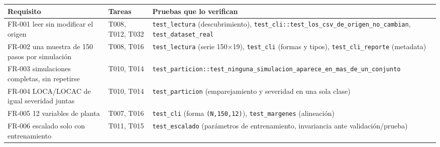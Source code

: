 \documentclass[12pt,a4paper]{article}
\newcounter{none} %
\newenvironment{documentogenerado}[2]{%
  \def\doccomando{#1}\def\docruta{#2}%
  \par\begingroup\small\setstretch{1.15}\sloppy%
}{\endgroup\par\medskip}
\begin{document}
\begin{documentogenerado}{/speckit-analyze + /speckit-converge}{specs\slash 001-preparacion-datos\slash auditoria.md}
{\def\LTcaptype{none} %
\begin{longtable}[]{@{}
  >{\raggedright\arraybackslash\hspace{0pt}}p{}
  >{\raggedright\arraybackslash\hspace{0pt}}p{}
  >{\raggedright\arraybackslash\hspace{0pt}}p{}@{}}
\toprule\noalign{}
\begin{minipage}[b]{\linewidth}\raggedright
Requisito
\end{minipage} & \begin{minipage}[b]{\linewidth}\raggedright
Tareas
\end{minipage} & \begin{minipage}[b]{\linewidth}\raggedright
Pruebas que lo verifican
\end{minipage} \\
\midrule\noalign{}
\endhead
\bottomrule\noalign{}
\endlastfoot
FR-001 leer sin modificar el origen & T008, T012, T032 & \texttt{test\_\allowbreak{}lectura} (descubrimiento), \texttt{test\_\allowbreak{}cli::test\_\allowbreak{}los\_\allowbreak{}csv\_\allowbreak{}de\_\allowbreak{}origen\_\allowbreak{}no\_\allowbreak{}cambian}, \texttt{test\_\allowbreak{}dataset\_\allowbreak{}real} \\
FR-002 una muestra de 150 pasos por simulación & T008, T016 & \texttt{test\_\allowbreak{}lectura} (serie 150×19), \texttt{test\_\allowbreak{}cli} (formas y tipos), \texttt{test\_\allowbreak{}cli\_\allowbreak{}reporte} (metadata) \\
FR-003 simulaciones completas, sin repetirse & T010, T014 & \texttt{test\_\allowbreak{}particion::test\_\allowbreak{}ninguna\_\allowbreak{}simulacion\_\allowbreak{}aparece\_\allowbreak{}en\_\allowbreak{}mas\_\allowbreak{}de\_\allowbreak{}un\_\allowbreak{}conjunto} \\
FR-004 LOCA/\hspace{0pt}LOCAC de igual severidad juntas & T010, T014 & \texttt{test\_\allowbreak{}particion} (emparejamiento y severidad en una sola clase) \\
FR-005 12 variables de planta & T007, T016 & \texttt{test\_\allowbreak{}cli} (forma \texttt{(N,150,12)}), \texttt{test\_\allowbreak{}margenes} (alineación) \\
FR-006 escalado solo con entrenamiento & T011, T015 & \texttt{test\_\allowbreak{}escalado} (parámetros de entrenamiento, invariancia ante validación/\hspace{0pt}prueba) \\

\end{longtable}}
\end{documentogenerado}
\end{document}
